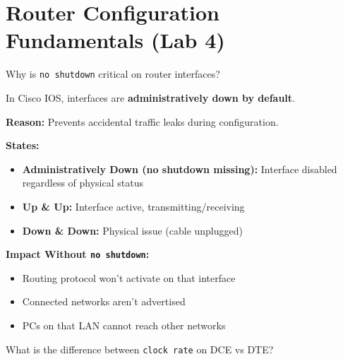 \documentclass[12pt,a4paper]{article}
\begin{document}
\section{Router Configuration Fundamentals (Lab 4)}

\begin{qbox}{Why is \texttt{no shutdown} critical on router interfaces?}
\end{qbox}

\begin{abox}
In Cisco IOS, interfaces are \textbf{administratively down by default}.

\textbf{Reason:} Prevents accidental traffic leaks during configuration.

\textbf{States:}
\begin{itemize}
    \item \textbf{Administratively Down (no shutdown missing):} Interface disabled regardless of physical status
    \item \textbf{Up \& Up:} Interface active, transmitting/receiving
    \item \textbf{Down \& Down:} Physical issue (cable unplugged)
\end{itemize}

\textbf{Impact Without \texttt{no shutdown}:}
\begin{itemize}
    \item Routing protocol won't activate on that interface
    \item Connected networks aren't advertised
    \item PCs on that LAN cannot reach other networks
\end{itemize}
\end{abox}


\begin{qbox}{What is the difference between \texttt{clock rate} on DCE vs DTE?}
\end{qbox}
\end{document}
